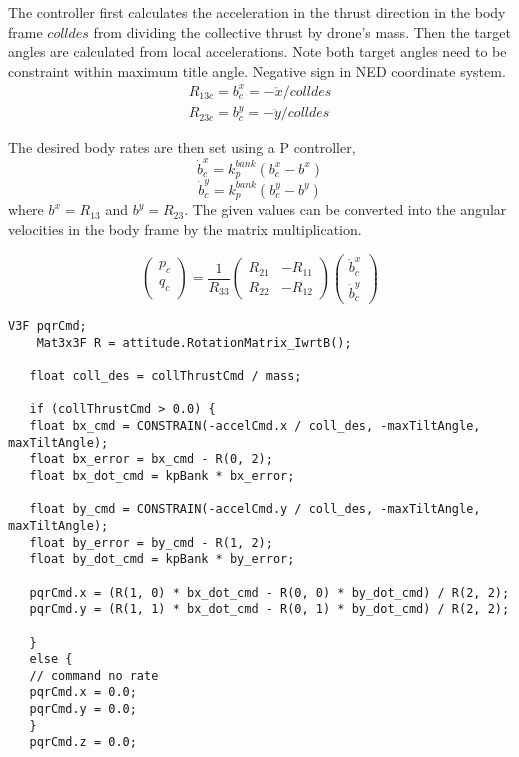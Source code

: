 \documentclass[letterpaper]{article}
\begin{document}
The controller first calculates the acceleration in the thrust direction in the body frame $colldes$ from dividing the collective thrust by drone's mass. Then the target angles are calculated from local accelerations. Note both target angles need to be constraint within maximum title angle. Negative sign in NED coordinate system.
\begin{gather*}
R_{13c} = b^x_c = - \ddot{x} / colldes \\
R_{23c} = b^y_c = - \ddot{y} / colldes
\end{gather*}

The desired body rates are then set using a P controller,
$$\dot{b}^x_c  = k_p^{bank}(b^x_c - b^x)$$
$$\dot{b}^y_c  = k_p^{bank}(b^y_c - b^y)$$
where $b^x = R_{13}$ and $b^y = R_{23}$. The given values can be converted into the angular velocities in the body frame by the matrix multiplication. 

$$
\begin{pmatrix} p_c \\ q_c \\ \end{pmatrix}  = \frac{1}{R_{33}}\begin{pmatrix} R_{21} & -R_{11} \\ R_{22} & -R_{12} \end{pmatrix} \begin{pmatrix} \dot{b}^x_c \\ \dot{b}^y_c  \end{pmatrix} 
$$

\begin{lstlisting}[frame=single]
    V3F pqrCmd;
    Mat3x3F R = attitude.RotationMatrix_IwrtB();
    
   float coll_des = collThrustCmd / mass;
   
   if (collThrustCmd > 0.0) {
   float bx_cmd = CONSTRAIN(-accelCmd.x / coll_des, -maxTiltAngle, maxTiltAngle);
   float bx_error = bx_cmd - R(0, 2);
   float bx_dot_cmd = kpBank * bx_error;
   
   float by_cmd = CONSTRAIN(-accelCmd.y / coll_des, -maxTiltAngle, maxTiltAngle);
   float by_error = by_cmd - R(1, 2);
   float by_dot_cmd = kpBank * by_error;
   
   pqrCmd.x = (R(1, 0) * bx_dot_cmd - R(0, 0) * by_dot_cmd) / R(2, 2);
   pqrCmd.y = (R(1, 1) * bx_dot_cmd - R(0, 1) * by_dot_cmd) / R(2, 2);
   
   }
   else {
   // command no rate
   pqrCmd.x = 0.0;
   pqrCmd.y = 0.0;
   }
   pqrCmd.z = 0.0;
\end{lstlisting}
\end{document}
